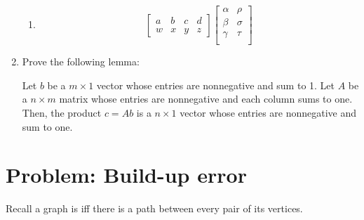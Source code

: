 \documentclass[12pt]{article}
\begin{document}
\begin{enumerate}
\begin{enumerate}
\item
\begin{equation*}
\begin{bmatrix}
a & b & c & d \\
w & x & y & z
\end{bmatrix} 
\begin{bmatrix}
\alpha & \rho \\
\beta & \sigma \\
\gamma & \tau \\
\end{bmatrix} 
\end{equation*}

\end{enumerate}

\item
Prove the following lemma:
\begin{lemma}
Let $b$ be a $m \times 1$ vector whose entries are nonnegative and sum to 1. Let $A$ be a $n \times m$ matrix whose entries are nonnegative and each column sums to one. Then, the product $c=Ab$ is a $n \times 1$ vector whose entries are nonnegative and sum to one.
\end{lemma}


\end{enumerate}


\iffalse
\section{Problem: Build-up error}
Recall a graph is  iff there is a path between every pair of its vertices.
\end{document}
